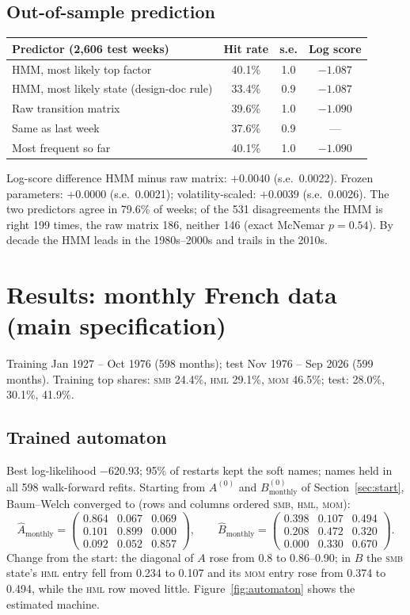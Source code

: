 \documentclass[11pt]{article}
\newcommand{\SMB}{\textsc{smb}}
\newcommand{\HML}{\textsc{hml}}
\newcommand{\MOM}{\textsc{mom}}
\begin{document}
\subsection{Out-of-sample prediction}
\begin{center}
\begin{tabular}{lccc}
\toprule
Predictor (2{,}606 test weeks) & Hit rate & s.e. & Log score \\
\midrule
HMM, most likely top factor & 40.1\% & 1.0 & $-1.087$ \\
HMM, most likely state (design-doc rule) & 33.4\% & 0.9 & $-1.087$ \\
Raw transition matrix & 39.6\% & 1.0 & $-1.090$ \\
Same as last week & 37.6\% & 0.9 & --- \\
Most frequent so far & 40.1\% & 1.0 & $-1.090$ \\
\bottomrule
\end{tabular}
\end{center}
Log-score difference HMM minus raw matrix: $+0.0040$ (s.e.\ 0.0022). Frozen parameters: $+0.0000$ (s.e.\ 0.0021); volatility-scaled: $+0.0039$ (s.e.\ 0.0026). The two predictors agree in 79.6\% of weeks; of the 531 disagreements the HMM is right 199 times, the raw matrix 186, neither 146 (exact McNemar $p=0.54$). By decade the HMM leads in the 1980s--2000s and trails in the 2010s.

\section{Results: monthly French data (main specification)}\label{sec:monthly}

Training Jan 1927 -- Oct 1976 (598 months); test Nov 1976 -- Sep 2026 (599 months). Training top shares: \SMB{} 24.4\%, \HML{} 29.1\%, \MOM{} 46.5\%; test: 28.0\%, 30.1\%, 41.9\%.

\subsection{Trained automaton}
Best log-likelihood $-620.93$; 95\% of restarts kept the soft names; names held in all 598 walk-forward refits. Starting from $A^{(0)}$ and $B^{(0)}_{\text{monthly}}$ of Section~\ref{sec:start}, Baum--Welch converged to (rows and columns ordered \SMB, \HML, \MOM):
\[
\hat A_{\text{monthly}}=
\begin{pmatrix}
0.864 & 0.067 & 0.069\\
0.101 & 0.899 & 0.000\\
0.092 & 0.052 & 0.857
\end{pmatrix},
\qquad
\hat B_{\text{monthly}}=
\begin{pmatrix}
0.398 & 0.107 & 0.494\\
0.208 & 0.472 & 0.320\\
0.000 & 0.330 & 0.670
\end{pmatrix}.
\]
Change from the start: the diagonal of $A$ rose from 0.8 to 0.86--0.90; in $B$ the \SMB{} state's \HML{} entry fell from 0.234 to 0.107 and its \MOM{} entry rose from 0.374 to 0.494, while the \HML{} row moved little. Figure~\ref{fig:automaton} shows the estimated machine.
\end{document}
